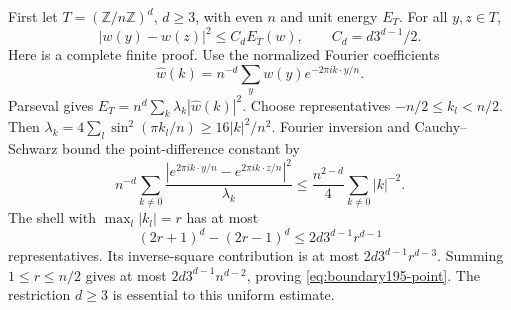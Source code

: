 First let $T=(\mathbb Z/n\mathbb Z)^d$, $d\ge3$, with even $n$ and unit
energy $E_T$. For all $y,z\in T$,
\begin{equation}\label{eq:boundary195-point}
 |w(y)-w(z)|^2\le C_d E_T(w),\qquad C_d=d3^{d-1}/2.
\end{equation}
Here is a complete finite proof. Use the normalized Fourier coefficients
\[
 \widehat w(k)=n^{-d}\sum_y w(y)e^{-2\pi i k\cdot y/n}.
\]
Parseval gives $E_T=n^d\sum_k\lambda_k|\widehat w(k)|^2$.
Choose representatives $-n/2\le k_l<n/2$. Then
$\lambda_k=4\sum_l\sin^2(\pi k_l/n)\ge16|k|^2/n^2$.
Fourier inversion and Cauchy--Schwarz bound the point-difference constant by
\[
 n^{-d}\sum_{k\ne0}
 \frac{|e^{2\pi i k\cdot y/n}-e^{2\pi i k\cdot z/n}|^2}{\lambda_k}
 \le\frac{n^{2-d}}4\sum_{k\ne0}|k|^{-2}.
\]
The shell with $\max_l|k_l|=r$ has at most
\[
 (2r+1)^d-(2r-1)^d\le2d3^{d-1}r^{d-1}
\]
representatives. Its inverse-square contribution is at most
$2d3^{d-1}r^{d-3}$. Summing $1\le r\le n/2$ gives at most
$2d3^{d-1}n^{d-2}$, proving \eqref{eq:boundary195-point}.
The restriction $d\ge3$ is essential to this uniform estimate.

